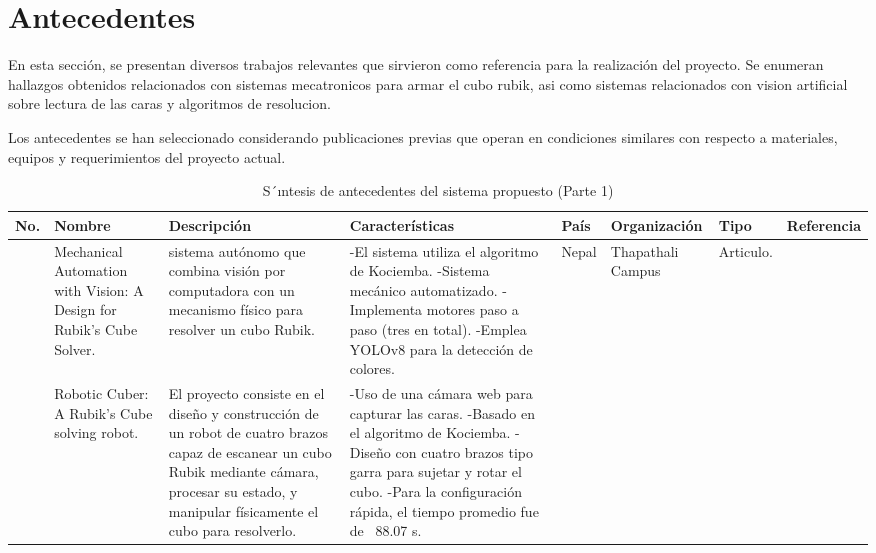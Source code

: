 \section{Antecedentes}

\label{Antecedentes}
En esta sección, se presentan diversos trabajos relevantes que sirvieron como referencia para la realización del proyecto. Se enumeran hallazgos obtenidos relacionados con sistemas mecatronicos para armar el cubo rubik, asi como sistemas relacionados con vision artificial sobre lectura de las caras y algoritmos de resolucion.

Los antecedentes se han seleccionado considerando publicaciones previas que operan en condiciones similares con respecto a materiales, equipos y requerimientos del proyecto actual. 


\begin{sidewaystable}
  \scriptsize
  \centering
  \caption{ S´ıntesis de antecedentes del sistema propuesto (Parte 1)}
  \begin{tabular}{m{5mm} m{25mm} m{45mm} m{35mm} m{20mm} m{20mm} m{15mm} m{25mm}}
    \toprule
    \centering \textbf{No.} & \centering \textbf{Nombre} & \centering \textbf{Descripción} & \centering \textbf{Características} & \centering \textbf{País} & \centering \textbf{Organización} & \centering \textbf{Tipo} & \textbf{Referencia} \\ 
    \midrule
    \centering 1 & \centering Mechanical Automation with Vision: A Design for Rubik’s Cube
Solver. & 
    \parbox{45mm}{sistema autónomo que combina visión por computadora con un mecanismo físico para resolver un cubo Rubik.} & 
    \parbox{35mm}{
      -El sistema utiliza el algoritmo de Kociemba.
      -Sistema mecánico automatizado.
      -Implementa motores paso a paso (tres en total).
      -Emplea YOLOv8 para la detección de colores.} & 
    \centering Nepal & \centering Thapathali Campus & \centering Articulo. &  \\ 
    \midrule
     & \centering Robotic Cuber: A Rubik’s Cube solving robot. & \centering El proyecto consiste en el diseño y construcción de un robot de cuatro brazos capaz de escanear un cubo Rubik mediante cámara, procesar su estado, y manipular físicamente el cubo para resolverlo. & 
    \parbox{35mm}{
    -Uso de una cámara web para capturar las caras.
    -Basado en el algoritmo de Kociemba.
    -Diseño con cuatro brazos tipo garra para sujetar y rotar el cubo.
    -Para la configuración rápida, el tiempo promedio fue de ~88.07 s.
}
\end{tabular}
\end{sidewaystable}
